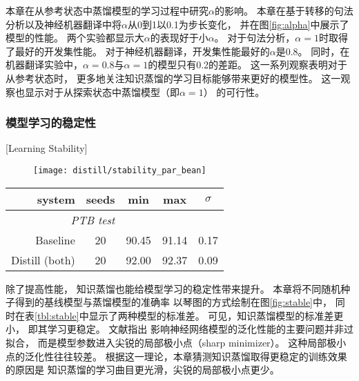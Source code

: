 本章在从参考状态中蒸馏模型的学习过程中研究$\alpha$的影响。
本章在基于转移的句法分析以及神经机器翻译中将$\alpha$从0到1以0.1为步长变化，
并在图\ref{fig:alpha}中展示了模型的性能。
两个实验都显示大$\alpha$的表现好于小$\alpha$。
对于句法分析，$\alpha=1$时取得了最好的开发集性能。
对于神经机器翻译，开发集性能最好的$\alpha$是0.8。
同时，在机器翻译实验中，$\alpha=0.8$与$\alpha=1$的模型只有0.2的差距。
这一系列观察表明对于从参考状态时，
更多地关注知识蒸馏的学习目标能够带来更好的模型性。
这一观察也显示对于从探索状态中蒸馏模型（即$\alpha=1$）
的可行性。

\subsubsection{模型学习的稳定性}[Learning Stability]
\begin{figure}[t]
	\centering
	\texttt{[image: distill/stability\_par\_bean]}
\end{figure}

\begin{table}[t]
	\vspace{0.5em}\centering\wuhao
	\begin{tabular}{rcccc}
		\toprule[1.5pt]
		system & seeds & min & max & $\sigma$ \\
		\midrule[1pt]
		\multicolumn{2}{r}{\it PTB test} & & & \\
		Baseline & 20 & 90.45 & 91.14 & 0.17 \\
		Distill (both) & 20 & 92.00 & 92.37 & 0.09 \\
		\bottomrule[1.5pt]
	\end{tabular}
\end{table}
除了提高性能，
知识蒸馏也能给模型学习的稳定性带来提升。
本章将不同随机种子得到的基线模型与蒸馏模型的准确率
以琴图的方式绘制在图\ref{fig:stable}中，
同时在表\ref{tbl:stable}中显示了两种模型的标准差。
可见，知识蒸馏模型的标准差更小，
即其学习更稳定。
文献指出
影响神经网络模型的泛化性能的主要问题并非过拟合，
而是模型参数进入尖锐的局部极小点（sharp minimizer）。
这种局部极小点的泛化性往往较差。
根据这一理论，本章猜测知识蒸馏取得更稳定的训练效果的原因是
知识蒸馏的学习曲目更光滑，尖锐的局部极小点更少。

